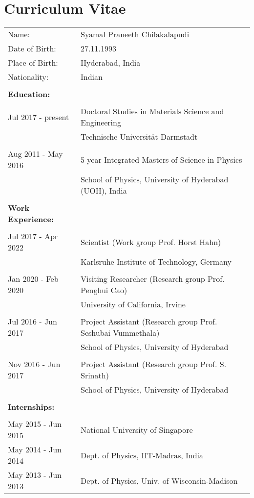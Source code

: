 \chapter{Curriculum Vitae} \label{c:chapters/cv}

\begin{tabular}{l l}
	Name: & Syamal Praneeth Chilakalapudi  \\
	Date of Birth: & 27.11.1993  \\
	Place of Birth:	& Hyderabad, India  \\
	Nationality: & Indian  \\
	& \\
	\textbf{\large Education:} & \\
	& \\
	Jul 2017 - present & Doctoral Studies in Materials Science and Engineering\\
	& Technische Universit\"at Darmstadt \\
	& \\			
	Aug 2011 - May 2016 & 5-year Integrated Masters of Science in Physics \\
	& School of Physics, University of Hyderabad (UOH), India \\
	& \\
	\textbf{\large Work Experience:} & \\
	& \\
	Jul 2017 - Apr 2022 & Scientist (Work group Prof. Horst Hahn)\\
	& Karlsruhe Institute of Technology, Germany \\
	& \\
	Jan 2020 - Feb 2020 & Visiting Researcher (Research group Prof. Penghui Cao)\\
	& University of California, Irvine \\
	& \\
	Jul 2016 - Jun 2017	& Project Assistant (Research group Prof. Seshubai Vummethala) \\
	& School of Physics, University of Hyderabad \\
	& \\
	Nov 2016 - Jun 2017	& Project Assistant (Research group Prof. S. Srinath)\\
	& School of Physics, University of Hyderabad \\
	& \\
	\textbf{\large Internships:} & \\
	& \\
	May 2015 - Jun 2015 & National University of Singapore\\	
	May 2014 - Jun 2014 & Dept. of Physics, IIT-Madras, India\\
	May 2013 - Jun 2013 & Dept. of Physics, Univ. of Wisconsin-Madison\\
\end{tabular}
